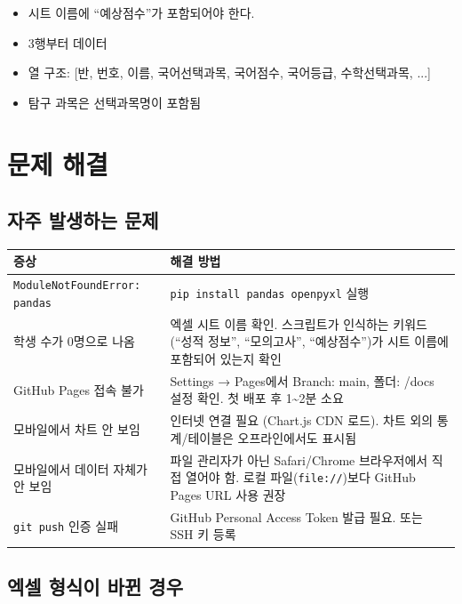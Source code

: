\documentclass[11pt,a4paper]{article}
\begin{document}
\begin{itemize}
  \item 시트 이름에 ``예상점수''가 포함되어야 한다.
  \item 3행부터 데이터
  \item 열 구조: [반, 번호, 이름, 국어선택과목, 국어점수, 국어등급, 수학선택과목, ...]
  \item 탐구 과목은 선택과목명이 포함됨
\end{itemize}


\section{문제 해결}

\subsection{자주 발생하는 문제}

\begin{longtable}{p{5cm}p{9cm}}
\toprule
\textbf{증상} & \textbf{해결 방법} \\
\midrule
\texttt{ModuleNotFoundError: pandas} & \texttt{pip install pandas openpyxl} 실행 \\
\midrule
학생 수가 0명으로 나옴 & 엑셀 시트 이름 확인. 스크립트가 인식하는 키워드(``성적 정보'', ``모의고사'', ``예상점수'')가 시트 이름에 포함되어 있는지 확인 \\
\midrule
GitHub Pages 접속 불가 & Settings → Pages에서 Branch: main, 폴더: /docs 설정 확인. 첫 배포 후 1\textasciitilde2분 소요 \\
\midrule
모바일에서 차트 안 보임 & 인터넷 연결 필요 (Chart.js CDN 로드). 차트 외의 통계/테이블은 오프라인에서도 표시됨 \\
\midrule
모바일에서 데이터 자체가 안 보임 & 파일 관리자가 아닌 Safari/Chrome 브라우저에서 직접 열어야 함. 로컬 파일(\texttt{file://})보다 GitHub Pages URL 사용 권장 \\
\midrule
\texttt{git push} 인증 실패 & GitHub Personal Access Token 발급 필요. 또는 SSH 키 등록 \\
\bottomrule
\end{longtable}

\subsection{엑셀 형식이 바뀐 경우}
\end{document}
